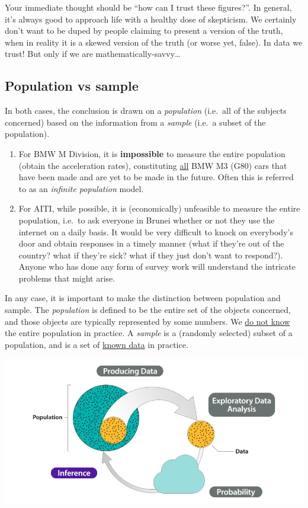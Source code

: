 \documentclass[
]{book}
\theoremstyle{definition}
\theoremstyle{definition}
\theoremstyle{definition}
\theoremstyle{definition}
\theoremstyle{remark}
\begin{document}
Your immediate thought should be ``how can I trust these figures?''. In general, it's always good to approach life with a healthy dose of skepticism. We certainly don't want to be duped by people claiming to present a version of the truth, when in reality it is a skewed version of the truth (or worse yet, false). In data we trust! But only if we are mathematically-savvy\ldots{}

\hypertarget{population-vs-sample}{%
\subsection*{Population vs sample}\label{population-vs-sample}}

In both cases, the conclusion is drawn on a \emph{population} (i.e.~all of the subjects concerned) based on the information from a \emph{sample} (i.e.~a subset of the population).

\begin{enumerate}
\def\labelenumi{\arabic{enumi}.}
\item
  For BMW M Division, it is \textbf{impossible} to measure the entire population (obtain the acceleration rates), constituting \uline{all} BMW M3 (G80) cars that have been made and are yet to be made in the future. Often this is referred to as an \emph{infinite population} model.
\item
  For AITI, while possible, it is (economically) unfeasible to measure the entire population, i.e.~to ask everyone in Brunei whether or not they use the internet on a daily basis. It would be very difficult to knock on everybody's door and obtain responses in a timely manner (what if they're out of the country? what if they're sick? what if they just don't want to respond?). Anyone who has done any form of survey work will understand the intricate problems that might arise.
\end{enumerate}

In any case, it is important to make the distinction between population and sample.
The \emph{population} is defined to be the entire set of the objects concerned, and those objects are typically represented by some numbers. We \uline{do not know} the entire population in practice.
A \emph{sample} is a (randomly selected) subset of a population, and is a set of \uline{known data} in practice.

\begin{center}\includegraphics[width=0.9\linewidth]{figure/00-popsample} \end{center}
\end{document}
